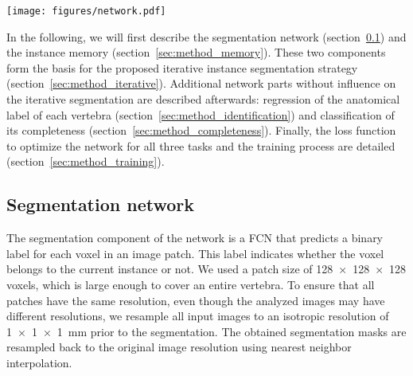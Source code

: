 \documentclass[authoryear,5p,final,times]{elsarticle}
\begin{document}
    \begin{figure*}[t]
        \centering
        \texttt{[image: figures/network.pdf]}
        \caption{Schematic drawing of the network architecture. I, M and S are 3D volumes, L is the predicted label in form of a single value, and C is the predicted probability for complete visibility. Cubes represent 3D feature maps with 84 channels in the path from I and M to S and 48 features maps in the two additional compression paths to L and C. Exceptions are the first cube after I and M, which has two channels as a result of the concatenation of I and M, and the cube before S, which has only one channel. Both dense layers map 48 features to a single value. The number on each cube indicates the size of the feature map (a cube \enquote{\num{128}} corresponds to a feature map of \num{128x128x128} voxels).}
        \label{fig:network}
    \end{figure*}
    
    In the following, we will first describe the segmentation network (section~\ref{sec:method_segmentation}) and the instance memory (section~\ref{sec:method_memory}). These two components form the basis for the proposed iterative instance segmentation strategy (section~\ref{sec:method_iterative}). Additional network parts without influence on the iterative segmentation are described afterwards: regression of the anatomical label of each vertebra (section~\ref{sec:method_identification}) and classification of its completeness (section~\ref{sec:method_completeness}). Finally, the loss function to optimize the network for all three tasks and the training process are detailed (section~\ref{sec:method_training}).
    
    \subsection{Segmentation network}
    \label{sec:method_segmentation}
    
    The segmentation component of the network is a FCN that predicts a binary label for each voxel in an image patch. This label indicates whether the voxel belongs to the current instance or not. We used a patch size of \num{128x128x128} voxels, which is large enough to cover an entire vertebra. To ensure that all patches have the same resolution, even though the analyzed images may have different resolutions, we resample all input images to an isotropic resolution of \SI{1x1x1}{\milli\meter} prior to the segmentation. The obtained segmentation masks are resampled back to the original image resolution using nearest neighbor interpolation.
    
\end{document}
